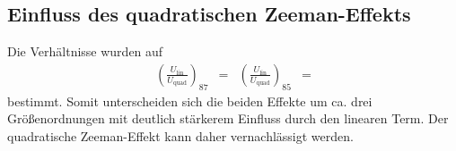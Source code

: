 \subsection{Einfluss des quadratischen Zeeman-Effekts}

Die Verhältnisse wurden auf
\begin{align*}
  \left(\frac{U_\text{lin}}{U_\text{quad}}\right)_{87} &=  & \left(\frac{U_\text{lin}}{U_\text{quad}}\right)_{85} &= 
\end{align*}
bestimmt.
Somit unterscheiden sich die beiden Effekte um ca. drei Größenordnungen mit deutlich stärkerem Einfluss durch den linearen Term.
Der quadratische Zeeman-Effekt kann daher vernachlässigt werden.
